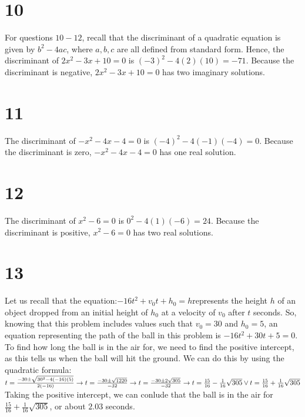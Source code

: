 \documentclass{article}
\theoremstyle{definition}
\begin{document}
\section*{10}
For questions $10-12$, recall that the discriminant of a quadratic equation is given by $b^2-4ac$, where $a,b,c$ are all defined from standard form. Hence, 
the discriminant of $2x^2-3x+10=0$ is $(-3)^2-4(2)(10)=-71$. Because the discriminant is negative, $2x^2-3x+10=0$ has two imaginary solutions.

\section*{11}
The discriminant of $-x^2-4x-4=0$ is $(-4)^2-4(-1)(-4)=0$. Because the discriminant is zero, $-x^2-4x-4=0$ has one real solution.

\section*{12}
The discriminant of $x^2-6=0$ is $0^2-4(1)(-6)=24$. Because the discriminant is positive, $x^2-6=0$ has two real solutions.

\section*{13}
Let us recall that the equation:\newline $-16t^2+v_0t+h_0=h$\newline represents the height $h$ of an object dropped from an initial height of $h_0$ at a 
velocity of $v_0$ after $t$ seconds. So, knowing that this problem includes values such that $v_0=30$ and $h_0=5$, an equation representing the path of 
the ball in this problem is $-16t^2+30t+5=0$. To find how long the ball is in the air for, we need to find the positive intercept, as this tells us 
when the ball will hit the ground. We can do this by using the quadratic formula:\newline
$t=\frac{-30\pm\sqrt{30^2-4(-16)(5)}}{2(-16)}\newline\rightarrow 
t=\frac{-30\pm\sqrt{1220}}{-32}\newline\rightarrow 
t=\frac{-30\pm 2\sqrt{305}}{-32}\newline\rightarrow 
t=\frac{15}{16}-\frac{1}{16}\sqrt{305}\vee t=\frac{15}{16}+\frac{1}{16}\sqrt{305}\newline$ Taking the positive intercept, we can conlude that 
the ball is in the air for $\frac{15}{16}+\frac{1}{16}\sqrt{305}$, or about $2.03$ seconds. 
\end{document}

